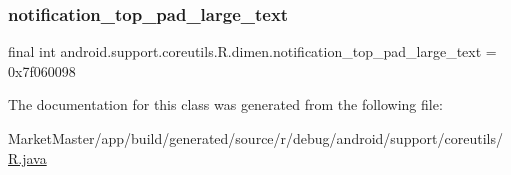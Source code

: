 \subsubsection{\texorpdfstring{notification\+\_\+top\+\_\+pad\+\_\+large\+\_\+text}{notification\_top\_pad\_large\_text}}
{\footnotesize\ttfamily final int android.\+support.\+coreutils.\+R.\+dimen.\+notification\+\_\+top\+\_\+pad\+\_\+large\+\_\+text = 0x7f060098\hspace{0.3cm}{\ttfamily [static]}}



The documentation for this class was generated from the following file\+:\begin{DoxyCompactItemize}
\item 
Market\+Master/app/build/generated/source/r/debug/android/support/coreutils/\mbox{\hyperlink{debug_2android_2support_2coreutils_2R_8java}{R.\+java}}\end{DoxyCompactItemize}
